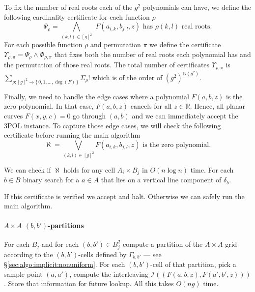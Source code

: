 To fix the number of real roots each of the $g^2$ polynomials can have, we
define the following cardinality certificate for each function $\rho$
\begin{displaymath}
	\Psi_{\rho} =
	\bigwedge_{(k,l)\in{[g]}^2}\,\,
	F(a_{i,k},b_{j,l},z)\,\,\text{has $\rho(k,l)$ real roots}.
\end{displaymath}
For each possible function $\rho$ and permutation $\pi$ we define the
certificate $\Upsilon_{\rho,\pi} = \Psi_\rho \land \Phi_{\rho,\pi}$ that
fixes both the number of real roots each polynomial has and the permutation of
those real roots.
The total number of certificates $\Upsilon_{\rho,\pi}$ is
$\sum_{\rho\colon {[g]}^2 \to \{\,0,1,\ldots,\deg(F)\,\}} {\Sigma_\rho!}$
which is of the order of ${(g^2)}^{O(g^2)}$.

Finally, we need to handle the edge cases where a polynomial $F(a,b,z)$ is the
zero polynomial. In that case, $F(a,b,z)$ cancels for all $z \in
\mathbb{R}$. Hence, all planar curves $F(x,y,c)=0$ go through $(a,b)$ and we
can immediately accept the 3POL instance. To capture
those edge cases, we will check the following certificate before running the main
algorithm
\begin{displaymath}
	\aleph = \bigvee_{(k,l)\in{{[g]}^2}} F(a_{i,k},b_{j,l},z)\,\,\text{is the zero polynomial}.
\end{displaymath}

We can check if $\aleph$ holds for any cell $A_i \times B_j$ in $O(n \log n)$ time.
For each $b \in B$ binary search for a $a \in A$ that lies on a vertical line
component of $\delta_b$.

If this certificate is verified we accept and halt. Otherwise we can safely run
the main algorithm.

\paragraph{$A \times A$ $(b,b')$-partitions}
For each $B_j$ and for each $(b,b') \in B_j^2$ compute a partition of the
$A \times A$ grid according to the $(b,b')$-cells defined by $\Gamma_{b,b'}$
--- see \S\ref{sec:algo:implicit:nonuniform}. For each $(b,b')$-cell of
that partition, pick a sample point $(a,a')$, compute the interleaving
$\mathcal{I}((F(a,b,z),F(a',b',z)))$. Store that information for future lookup.
All this takes $O(ng)$ time.

